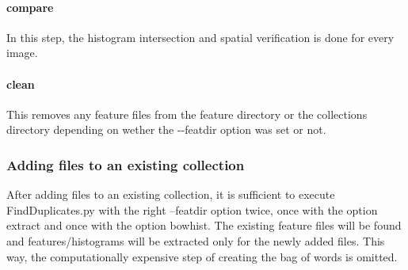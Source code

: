 \paragraph{\ttfamily compare}

In this step, the histogram intersection and spatial verification is done for every image.

\paragraph{\ttfamily clean}

This removes any feature files from the feature directory or the collections directory
depending on wether the {\ttfamily -{}-featdir} option was set or not.


\subsubsection*{Adding files to an existing collection}

After adding files to an existing collection, it is sufficient to execute
FindDuplicates.py with the right --featdir option twice, once with the option
extract and once with the option bowhist. The existing feature files will be
found and features/histograms will be extracted only for the newly added files.
This way, the computationally expensive step of creating the bag of words is
omitted. 